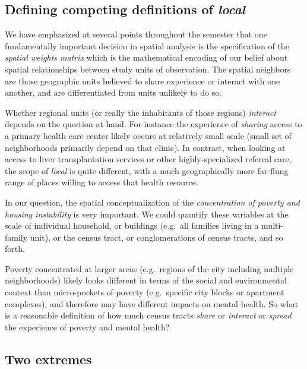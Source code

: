 \documentclass[
]{book}
\begin{document}
\hypertarget{defining-competing-definitions-of-local}{%
\subsection{\texorpdfstring{Defining competing definitions of \emph{local}}{Defining competing definitions of local}}\label{defining-competing-definitions-of-local}}

We have emphasized at several points throughout the semester that one fundamentally important decision in spatial analysis is the specification of the \emph{spatial weights matrix} which is the mathematical encoding of our belief about spatial relationships between study units of observation. The spatial neighbors are those geographic units believed to share experience or interact with one another, and are differentiated from units unlikely to do so.

Whether regional units (or really the inhabitants of those regions) \emph{interact} depends on the question at hand. For instance the experience of \emph{sharing} access to a primary health care center likely occurs at relatively small scale (small set of neighborhoods primarily depend on that clinic). In contrast, when looking at access to liver transplantation services or other highly-specialized referral care, the scope of \emph{local} is quite different, with a much geographically more far-flung range of places willing to access that health resource.

In our question, the spatial conceptualization of the \emph{concentration of poverty and housing instability} is very important. We could quantify these variables at the scale of individual household, or buildings (e.g.~all families living in a multi-family unit), or the census tract, or conglomerations of census tracts, and so forth.

Poverty concentrated at larger areas (e.g.~regions of the city including multiple neighborhoods) likely looks different in terms of the social and environmental context than micro-pockets of poverty (e.g.~specific city blocks or apartment complexes), and therefore may have different impacts on mental health. So what is a reasonable definition of how much census tracts \emph{share} or \emph{interact} or \emph{spread} the experience of poverty and mental health?

\hypertarget{two-extremes}{%
\subsection{Two extremes}\label{two-extremes}}
\end{document}
